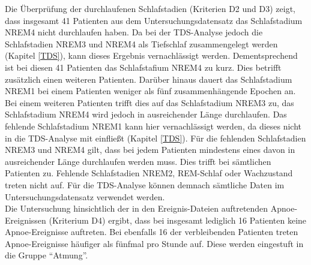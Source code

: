 Die Überprüfung der durchlaufenen Schlafstadien (Kriterien D2 und D3) zeigt, dass insgesamt 41 Patienten aus dem Untersuchungsdatensatz das Schlafstadium \acs{NREM}4 nicht durchlaufen haben. Da bei der \acs{TDS}-Analyse jedoch die Schlafstadien \acs{NREM}3 und \acs{NREM}4 als Tiefschlaf zusammengelegt werden (Kapitel \ref{TDS}), kann dieses Ergebnis vernachlässigt werden. Dementsprechend ist bei diesen 41 Patienten das Schlafstafium \acs{NREM}4 zu kurz. Dies betrifft zusätzlich einen weiteren Patienten. Darüber hinaus dauert das Schlafstadium \acs{NREM}1 bei einem Patienten weniger als fünf zusammenhängende Epochen an. Bei einem weiteren Patienten trifft dies auf das Schlafstadium \acs{NREM}3 zu, das Schlafstadium \acs{NREM}4 wird jedoch in ausreichender Länge durchlaufen. Das fehlende Schlafstadium \acs{NREM}1 kann hier vernachlässigt werden, da dieses nicht in die \acs{TDS}-Analyse mit einfließt (Kapitel \ref{TDS}). Für die fehlenden Schlafstadien \acs{NREM}3 und \acs{NREM}4 gilt, dass bei jedem Patienten mindestens eines davon in ausreichender Länge durchlaufen werden muss. Dies trifft bei sämtlichen Patienten zu. Fehlende Schlafstadien \acs{NREM}2, \acs{REM}-Schlaf oder Wachzustand treten nicht auf. Für die \acs{TDS}-Analyse können demnach sämtliche Daten im Untersuchungsdatensatz verwendet werden.\\

Die Untersuchung hinsichtlich der in den Ereignis-Dateien auftretenden Apnoe-Ereignissen (Kriterium D4) ergibt, dass bei insgesamt lediglich 16 Patienten keine Apnoe-Ereignisse auftreten. Bei ebenfalls 16 der verbleibenden Patienten treten Apnoe-Ereignisse häufiger als fünfmal pro Stunde auf. Diese werden eingestuft in die Gruppe "`Atmung"'.\\

